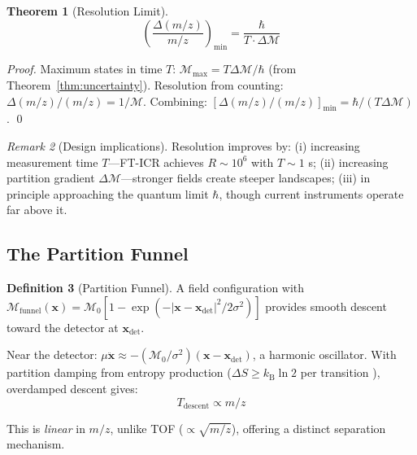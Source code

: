 \documentclass[twocolumn,10pt,a4paper]{article}
\newtheorem{theorem}{Theorem}[section]
\theoremstyle{definition}
\newtheorem{definition}[theorem]{Definition}
\theoremstyle{remark}
\newtheorem{remark}[theorem]{Remark}
\newcommand{\kB}{k_{\mathrm{B}}}
\newcommand{\Depth}{\mathcal{M}}
\newcommand{\partinert}{\mu}
\newcommand{\xdet}{\mathbf{x}_{\mathrm{det}}}
\begin{document}
\begin{theorem}[Resolution Limit]
\label{thm:resolution}
\begin{equation}
    \boxed{\left(\frac{\Delta(m/z)}{m/z}\right)_{\min} = \frac{\hbar}{T \cdot \Delta\Depth}}
    \label{eq:resolution}
\end{equation}
\end{theorem}

\begin{proof}
Maximum states in time $T$: $\Depth_{\max} = T\Delta\Depth/\hbar$ (from Theorem~\ref{thm:uncertainty}). Resolution from counting: $\Delta(m/z)/(m/z) = 1/\Depth$. Combining: $[\Delta(m/z)/(m/z)]_{\min} = \hbar/(T\Delta\Depth)$. \qed
\end{proof}

\begin{remark}[Design implications]
Resolution improves by: (i) increasing measurement time $T$---FT-ICR achieves $R \sim 10^6$ with $T \sim 1$ s; (ii) increasing partition gradient $\Delta\Depth$---stronger fields create steeper landscapes; (iii) in principle approaching the quantum limit $\hbar$, though current instruments operate far above it.
\end{remark}

\subsection{The Partition Funnel}

\begin{definition}[Partition Funnel]
A field configuration with $\Depth_{\text{funnel}}(\mathbf{x}) = \Depth_0[1 - \exp(-|\mathbf{x} - \xdet|^2/2\sigma^2)]$ provides smooth descent toward the detector at $\xdet$.
\end{definition}

Near the detector: $\partinert\ddot{\mathbf{x}} \approx -(\Depth_0/\sigma^2)(\mathbf{x} - \xdet)$, a harmonic oscillator. With partition damping from entropy production ($\Delta S \geq \kB\ln 2$ per transition \citep{landauer1961}), overdamped descent gives:
\begin{equation}
    T_{\text{descent}} \propto m/z
\end{equation}

This is \emph{linear} in $m/z$, unlike TOF ($\propto\sqrt{m/z}$), offering a distinct separation mechanism.
\end{document}
